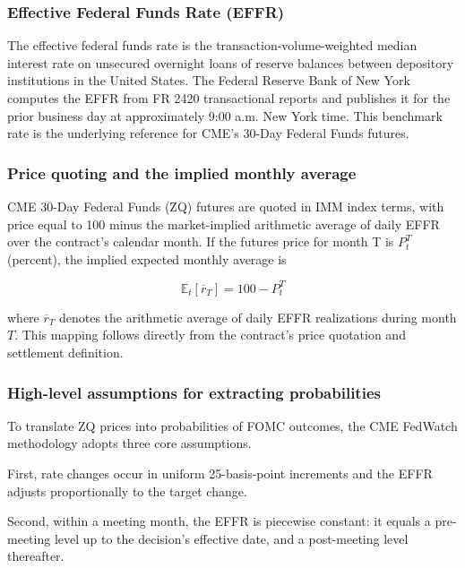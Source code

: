 \subsubsection{Effective Federal Funds Rate (EFFR)}

The effective federal funds rate is the transaction-volume-weighted median interest rate on unsecured overnight loans of reserve balances between depository institutions in the United States. The Federal Reserve Bank of New York computes the EFFR from FR 2420 transactional reports and publishes it for the prior business day at approximately 9:00 a.m. New York time. This benchmark rate is the underlying reference for CME’s 30-Day Federal Funds futures.

\subsubsection{Price quoting and the implied monthly average}

CME 30-Day Federal Funds (ZQ) futures are quoted in IMM index terms, with price equal to 100 minus the market-implied arithmetic average of daily EFFR over the contract’s calendar month. If the futures price for month T is $P_t^T$ (percent), the implied expected monthly average is

$$\mathbb{E}_t[\overline{r}_T] = 100 - P_t^T$$

where $\overline{r}_T$ denotes the arithmetic average of daily EFFR realizations during month $T$. This mapping follows directly from the contract’s price quotation and settlement definition. 


\subsubsection{High-level assumptions for extracting probabilities}

To translate ZQ prices into probabilities of FOMC outcomes, the CME FedWatch methodology adopts three core assumptions.

First, rate changes occur in uniform 25-basis-point increments and the EFFR adjusts proportionally to the target change.

Second, within a meeting month, the EFFR is piecewise constant: it equals a pre-meeting level up to the decision’s effective date, and a post-meeting level thereafter.

